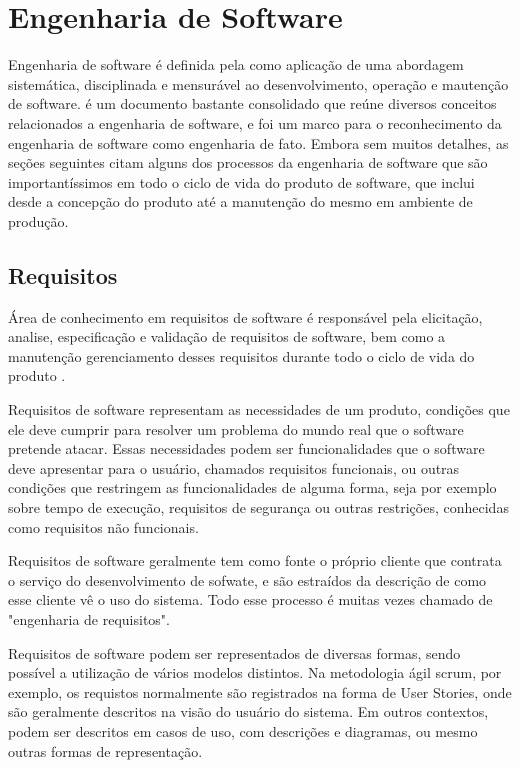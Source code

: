 \chapter{Engenharia de Software}
\label{cap:software}

Engenharia de software é definida pela  como aplicação de uma abordagem sistemática, disciplinada e mensurável ao desenvolvimento, operação e mautenção de software.  é um documento bastante consolidado que reúne diversos conceitos relacionados a engenharia de software, e foi um marco para o reconhecimento da engenharia de software como engenharia de fato. Embora sem muitos detalhes, as seções seguintes citam alguns dos processos da engenharia de software que são importantíssimos em todo o ciclo de vida do produto de software, que inclui desde a concepção do produto até a manutenção do mesmo em ambiente de produção.

\section{Requisitos}

Área de conhecimento em requisitos de software é responsável pela elicitação, analise, especificação e validação de requisitos de software, bem como a manutenção gerenciamento desses requisitos durante todo o ciclo de vida do produto \cite{swebok}.

Requisitos de software representam as necessidades de um produto, condições que ele deve cumprir para resolver um problema do mundo real que o software pretende atacar. Essas necessidades podem ser funcionalidades que o software deve apresentar para o usuário, chamados requisitos funcionais, ou outras condições que restringem as funcionalidades de alguma forma, seja por exemplo sobre tempo de execução, requisitos de segurança ou outras restrições, conhecidas como requisitos não funcionais.

Requisitos de software geralmente tem como fonte o próprio cliente que contrata o serviço do desenvolvimento de sofwate, e são estraídos da descrição de como esse cliente vê o uso do sistema. Todo esse processo é muitas vezes chamado de "engenharia de requisitos".

Requisitos de software podem ser representados de diversas formas, sendo possível a utilização de vários modelos distintos. Na metodologia ágil scrum, por exemplo, os requistos normalmente são registrados na forma de User Stories, onde são geralmente descritos na visão do usuário do sistema. Em outros contextos, podem ser descritos em casos de uso, com descrições e diagramas, ou mesmo outras formas de representação.

